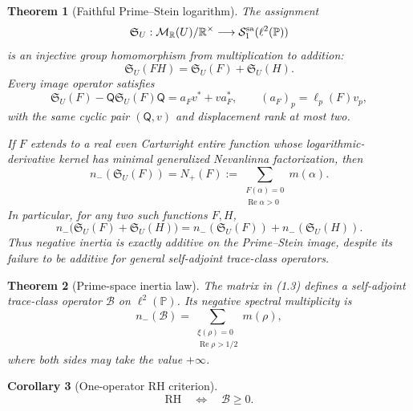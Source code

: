 \documentclass[11pt]{article}
\newtheorem{theorem}{Theorem}[section]
\newtheorem{corollary}[theorem]{Corollary}
\theoremstyle{definition}
\theoremstyle{remark}
\newcommand{\R}{\mathbb R}
\newcommand{\PP}{\mathbb P}
\newcommand{\cB}{\mathcal B}
\newcommand{\nm}{n_{-}}
\newcommand{\Rea}{\operatorname{Re}}
\begin{document}
\begin{theorem}[Faithful Prime--Stein logarithm]
\label{thm:logarithm}
The assignment
\[
 \mathfrak S_U:\mathcal M_{\R}(U)/\R^\times
 \longrightarrow \mathcal S_1^{\rm sa}(\ell^2(\PP))
\]
is an injective group homomorphism from multiplication to addition:
\begin{equation}
 \mathfrak S_U(FH)=\mathfrak S_U(F)+\mathfrak S_U(H).       \tag{PSL-1}
\end{equation}
Every image operator satisfies
\begin{equation}
 \mathfrak S_U(F)-\mathsf Q\mathfrak S_U(F)\mathsf Q
 =a_Fv^*+va_F^*,\qquad
 (a_F)_p=\ell_p(F)v_p,                                     \tag{PSL-2}
\end{equation}
with the same cyclic pair $(\mathsf Q,v)$ and displacement rank at most two.

If $F$ extends to a real even Cartwright entire function whose logarithmic-derivative kernel has
minimal generalized Nevanlinna factorization, then
\begin{equation}
 \nm(\mathfrak S_U(F))
 =N_+(F):=\sum_{\substack{F(\alpha)=0\\\Rea\alpha>0}}m(\alpha).
                                                               \tag{PSL-3}
\end{equation}
In particular, for any two such functions $F,H$,
\begin{equation}
 \nm\bigl(\mathfrak S_U(F)+\mathfrak S_U(H)\bigr)
 =\nm(\mathfrak S_U(F))+\nm(\mathfrak S_U(H)).             \tag{PSL-4}
\end{equation}
Thus negative inertia is exactly additive on the Prime--Stein image, despite its failure to be
additive for general self-adjoint trace-class operators.
\end{theorem}

\begin{theorem}[Prime-space inertia law]
\label{thm:inertia}
The matrix in \emph{(1.3)} defines a self-adjoint trace-class operator $\cB$ on
$\ell^2(\PP)$.  Its negative spectral multiplicity is
\begin{equation}
 \nm(\cB)
 =\sum_{\substack{\xi(\rho)=0\\ \Rea\rho>1/2}}m(\rho),      \tag{1.4}
\end{equation}
where both sides may take the value $+\infty$.
\end{theorem}

\begin{corollary}[One-operator RH criterion]
\label{cor:rh}
\begin{equation}
 \mathrm{RH}\quad\Longleftrightarrow\quad \cB\geq0.         \tag{1.5}
\end{equation}
\end{corollary}
\end{document}
